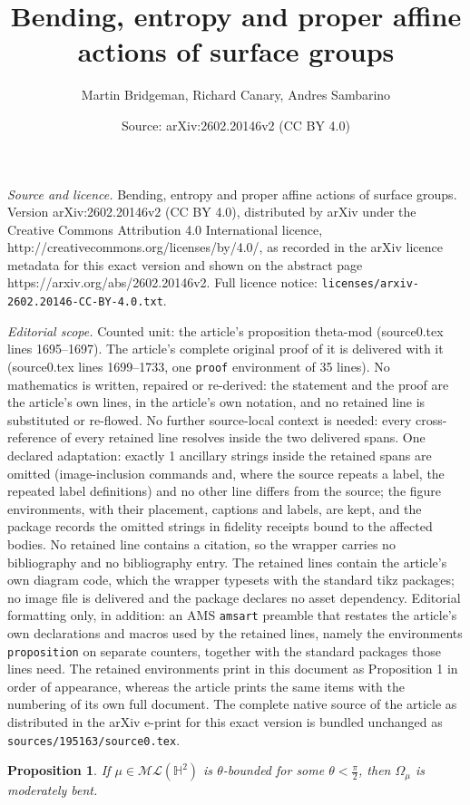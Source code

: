 \documentclass[10pt,a4paper]{amsart}
\title{Bending, entropy and proper affine actions of surface groups}
\author{Martin Bridgeman, Richard Canary, Andres Sambarino}
\date{Source: arXiv:2602.20146v2 (CC BY 4.0)}
\newtheorem{proposition}{Proposition}
\newcommand{\Hp}{{\mathbb H}^2}
\begin{document}
\maketitle

\noindent\emph{Source and licence.} Bending, entropy and proper affine actions of surface groups. Version arXiv:2602.20146v2 (CC BY 4.0), distributed by arXiv under the Creative Commons Attribution 4.0 International licence, http://creativecommons.org/licenses/by/4.0/, as recorded in the arXiv licence metadata for this exact version and shown on the abstract page https://arxiv.org/abs/2602.20146v2. Full licence notice: \texttt{licenses/arxiv-2602.20146-CC-BY-4.0.txt}.\par\smallskip

\noindent\textit{Editorial scope.} Counted unit: the article's proposition theta-mod (source0.tex lines 1695--1697). The article's complete original proof of it is delivered with it (source0.tex lines 1699--1733, one \texttt{proof} environment of 35 lines). No mathematics is written, repaired or re-derived: the statement and the proof are the article's own lines, in the article's own notation, and no retained line is substituted or re-flowed.  No further source-local context is needed: every cross-reference of every retained line resolves inside the two delivered spans.  One declared adaptation: exactly 1 ancillary strings inside the retained spans are omitted (image-inclusion commands and, where the source repeats a label, the repeated label definitions) and no other line differs from the source; the figure environments, with their placement, captions and labels, are kept, and the package records the omitted strings in fidelity receipts bound to the affected bodies.  No retained line contains a citation, so the wrapper carries no bibliography and no bibliography entry.  The retained lines contain the article's own diagram code, which the wrapper typesets with the standard tikz packages; no image file is delivered and the package declares no asset dependency.  Editorial formatting only, in addition: an AMS \texttt{amsart} preamble that restates the article's own declarations and macros used by the retained lines, namely the environments \texttt{proposition} on separate counters, together with the standard packages those lines need.  The retained environments print in this document as Proposition 1 in order of appearance, whereas the article prints the same items with the numbering of its own full document.  The complete native source of the article as distributed in the arXiv e-print for this exact version is bundled unchanged as \texttt{sources/195163/source0.tex}.
\begin{proposition}\label{theta-mod}
If $\mu\in \mathcal{ML}(\Hp)$ is $\theta$-bounded for some $\theta <\frac{\pi}{2}$, then $\Omega_\mu$ is moderately bent.
\end{proposition}
\end{document}
